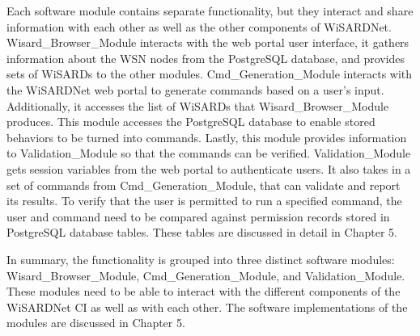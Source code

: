 Each software module contains separate functionality, but they interact and share information with each other as well as the other components of WiSARDNet. Wisard\_Browser\_Module interacts with the web portal user interface, it gathers information about the WSN nodes from the PostgreSQL database, and provides sets of WiSARDs to the other modules. Cmd\_Generation\_Module interacts with the WiSARDNet web portal to generate commands based on a user's input. Additionally, it accesses the list of WiSARDs that Wisard\_Browser\_Module produces. This module accesses the PostgreSQL database to enable stored behaviors to be turned into commands. Lastly, this module provides information to Validation\_Module so that the commands can be verified. Validation\_Module gets session variables from the web portal to authenticate users. It also takes in a set of commands from Cmd\_Generation\_Module, that can validate and report its results.  To verify that the user is permitted to run a specified command, the user and command need to be compared against permission records stored in PostgreSQL database tables. These tables are discussed in detail in Chapter 5.

In summary, the functionality is grouped into three distinct software modules: Wisard\_Browser\_Module, Cmd\_Generation\_Module, and Validation\_Module. These modules need to be able to interact with the different components of the WiSARDNet CI as well as with each other. The software implementations of the modules are discussed in Chapter 5.